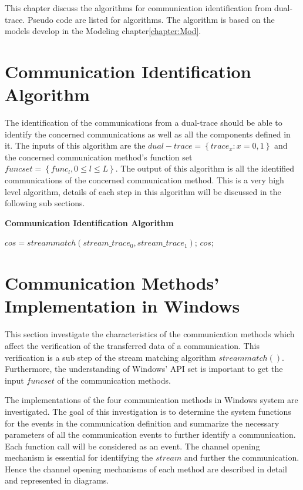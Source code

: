 

\label{chapter:appendix}
\label{chapter:alo}
This chapter discuss the algorithms for communication identification from dual-trace. Pseudo code are listed for algorithms. The algorithm is based on the models develop in the Modeling chapter\ref{chapter:Mod}.

\section{Communication Identification Algorithm}
The identification of the communications from a dual-trace should be able to identify the concerned communications as well as all the components defined in it. The inputs of this algorithm are the $dual-trace=\left\lbrace trace_{x}: x= 0,1 \right\rbrace $ and the concerned communication method's function set $funcset = \left \lbrace func_{l}, 0 \leqslant l \leqslant L\right\rbrace $. The output of this algorithm is all the identified communications of the concerned communication method. This is a very high level algorithm, details of each step in this algorithm will be discussed in the following sub sections.\par
\begin{algorithm}[H]
\DontPrintSemicolon
\caption{{\bf Communication Identification Algorithm} \label{endpointIdentAlg}}
$cos = streammatch(stream\_trace_{0}, stream\_trace_{1})$;\;
\KwRet $cos$;\;
\end{algorithm} 

\section{Communication Methods' Implementation in Windows}\label{windows}
This section investigate the characteristics of the communication methods which affect the verification of the transferred data of a communication. This verification is a sub step of the stream matching algorithm $streammatch()$. Furthermore, the understanding of Windows' API set is important to get the input $funcset$ of the communication methods. 

The implementations of the four communication methods in Windows system are investigated. The goal of this investigation is to determine the system functions for the events in the communication definition and summarize the necessary parameters of all the communication events to further identify a communication. Each function call will be considered as an event. The channel opening mechanism is essential for identifying the $stream$ and further the communication. Hence the channel opening mechanisms of each method are described in detail and represented in diagrams. 

